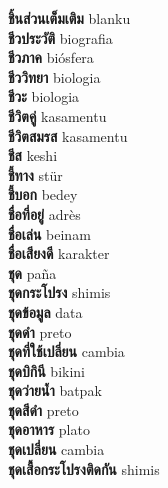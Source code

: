 \textbf{ ชิ้นส่วนเต็มเติม  } blanku \\
\textbf{ ชีวประวัติ  } biografia \\
\textbf{ ชีวภาค  } biósfera \\
\textbf{ ชีววิทยา  } biologia \\
\textbf{ ชีวะ  } biologia \\
\textbf{ ชีวิตคู่  } kasamentu \\
\textbf{ ชีวิตสมรส  } kasamentu \\
\textbf{ ชีส  } keshi \\
\textbf{ ชี้ทาง  } stür \\
\textbf{ ชี้บอก  } bedey \\
\textbf{ ชื่อที่อยู่  } adrès \\
\textbf{ ชื่อเล่น  } beinam \\
\textbf{ ชื่อเสียงดี  } karakter \\
\textbf{ ชุด  } paña \\
\textbf{ ชุดกระโปรง  } shimis \\
\textbf{ ชุดข้อมูล  } data \\
\textbf{ ชุดดำ  } preto \\
\textbf{ ชุดที่ใช้เปลี่ยน  } cambia \\
\textbf{ ชุดบิกินี  } bikini \\
\textbf{ ชุดว่ายน้ำ  } batpak \\
\textbf{ ชุดสีดำ  } preto \\
\textbf{ ชุดอาหาร  } plato \\
\textbf{ ชุดเปลี่ยน  } cambia \\
\textbf{ ชุดเสื้อกระโปรงติดกัน  } shimis \\
